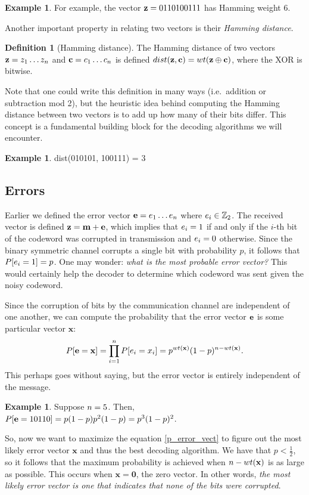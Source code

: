 \documentclass[12pt,twoside]{reedthesis}
\theoremstyle{definition}
\newtheorem{definition}[theorem]{Definition}
\newtheorem{example}[theorem]{Example}
\newcommand{\Z}{\mathbb{Z}}
\begin{document}
\begin{example}
For example, the vector $\mathbf{z} = 0110100111$ has Hamming weight 6.
\end{example}

Another important property in relating two vectors is their \textit{Hamming distance}.
\begin{definition}[Hamming distance] The Hamming distance of two vectors $\mathbf{z} = z_{1}  \ldots z_{n}$  and $\mathbf{c} = c_{1} \ldots c_{n}$ is defined $dist(\mathbf{z},\mathbf{c}) = wt(\mathbf{z} \oplus \mathbf{c})$, where the XOR is bitwise.
\end{definition}

Note that one could write this definition in many ways (i.e.~addition or subtraction mod 2), but the heuristic idea behind computing the Hamming distance between two vectors is to add up how many of their bits differ. This concept is a fundamental building block for the decoding algorithms we will encounter.

\begin{example}
dist(010101, 100111) = 3
\end{example}

\subsection{Errors}
Earlier we defined the error vector $\mathbf{e} = e_{1} \ldots e_{n}$ where $\evb{i} \in \Z_2$. The received vector is defined $\mathbf{z} = \mathbf{m} + \mathbf{e}$, which implies that $e_{i} = 1$ if and only if the $i$-th bit of the codeword was corrupted in transmission and $e_{i} = 0$ otherwise. Since the binary symmetric channel corrupts a single bit with probability $p$, it follows that $P[e_{i} = 1] = p$.  One may wonder: \textit{what is the most probable error vector?} This would certainly help the decoder to determine which codeword was sent given the noisy codeword.

Since the corruption of bits by the communication channel are independent of one another, we can compute the probability that the error vector $\mathbf{e}$ is some particular vector $\mathbf{x}$:
\begin{equation} \label{p_error_vect}
P[\mathbf{e} = \mathbf{x}] = \prod_{i = 1}^{n} P[e_{i} = x_i] = p^{wt(\mathbf{x})}(1-p)^{n-wt(\mathbf{x})}.
\end{equation}
This perhaps goes without saying, but the error vector is entirely independent of the message.
\begin{example}
Suppose $n=5$. Then, $P[\mathbf{e} = 10110] = p(1-p)p^2 (1-p) = p^3(1-p)^2$.
\end{example}
So, now we want to maximize the equation \ref{p_error_vect} to figure out the most likely error vector $\mathbf{x}$ and thus the best decoding algorithm. We have that $p < \frac{1}{2}$, so it follows that the maximum probability is achieved when $n-wt(\mathbf{x})$ is as large as possible. This occurs when $\mathbf{x} = \mathbf{0}$, the zero vector. In other words, \textit{the most likely error vector is one that indicates that none of the bits were corrupted}.
 
\end{document}
